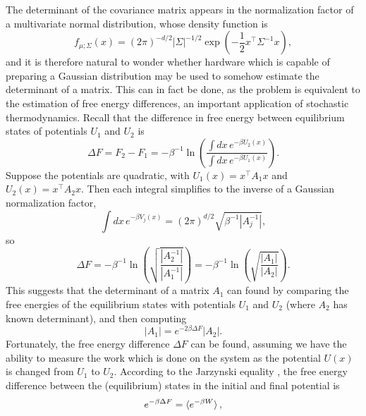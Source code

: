 \documentclass[prx,onecolumn,floatfix,longbibliography,notitlepage, nofootinbib,12pt]{revtex4-2}
\begin{document}
The determinant of the covariance matrix appears in the normalization factor of a multivariate normal distribution, whose density function is
\begin{equation}
    f_{\mu;\Sigma}(x) = (2 \pi)^{-d/2}\left| \Sigma\right|^{-1/2}
    \exp \left(-\frac{1}{2} x^\intercal \Sigma^{-1} x \right),
\end{equation}
and it is therefore natural to wonder whether hardware which is capable of preparing a Gaussian distribution may be used to somehow estimate the determinant of a matrix. This can in fact be done, as the problem is equivalent to the estimation of free energy differences, an important application of stochastic thermodynamics. Recall that the difference in free energy between equilibrium states of potentials $U_1$ and $U_2$ is \cite{christ2010basic}
\begin{equation}
    \Delta F = F_2 - F_1 = -\beta^{-1} \ln \left(\frac{\int dx \, e^{-\beta U_2(x)}}{\int dx \, e^{-\beta U_1(x)}}\right).
\end{equation}
Suppose the potentials are quadratic, with $U_1(x) = x^\intercal A_1 x$ and $U_2(x) = x^\intercal A_2 x$. Then each integral simplifies to the inverse of a Gaussian normalization factor,
\begin{equation}
    \int dx\,  e^{-\beta V_j(x)} = (2\pi)^{d/2}\sqrt{\beta^{-1}\left|A_j^{-1} \right|},
\end{equation}
so
\begin{equation}
    \Delta F = -\beta^{-1} \ln \left(\sqrt{\frac{\left| A_2^{-1}\right|}{\left| A_1^{-1}\right|}}\right) = -\beta^{-1} \ln \left(\sqrt{\frac{\left| A_1\right|}{\left| A_2\right|}}\right).
\end{equation}
This suggests that the determinant of a matrix $A_1$ can found by comparing the free energies of the equilibrium states with potentials $U_1$ and $U_2$ (where $A_2$ has known determinant), and then computing
\begin{equation}
    \left| A_1\right| = e^{-2 \beta \Delta F} \left| A_2\right|.
\end{equation}
Fortunately, the free energy difference $\Delta F$ can be found, assuming we have the ability to measure the work which is done on the system as the potential $U(x)$ is changed from $U_1$ to $U_2$. According to the Jarzynski equality \cite{jarzynski1997nonequilibrium}, the free energy difference between the (equilibrium) states in the initial and final potential is
\begin{equation}
    e^{-\beta \Delta F} = \braket{e^{-\beta W}},
\end{equation}
\end{document}

